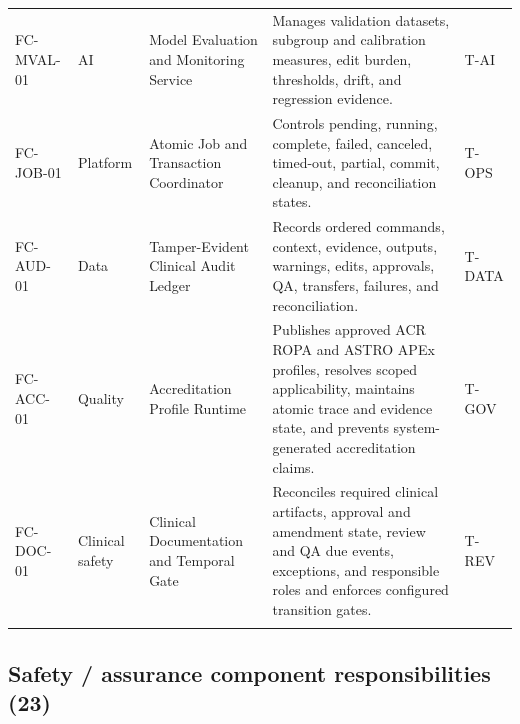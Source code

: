 \documentclass[11pt,letterpaper]{article}
\begin{document}
\begin{scriptsize}
\begin{longtable}{@{}L{0.15\textwidth}L{0.11\textwidth}L{0.21\textwidth}L{0.38\textwidth}L{0.08\textwidth}@{}}
\addlinespace[2pt]
\mbox{FC-MVAL-01} & AI & Model Evaluation and Monitoring Service & Manages validation datasets, subgroup and calibration measures, edit burden, thresholds, drift, and regression evidence. & T-AI \\
\addlinespace[2pt]
\mbox{FC-JOB-01} & Platform & Atomic Job and Transaction Coordinator & Controls pending, running, complete, failed, canceled, timed-out, partial, commit, cleanup, and reconciliation states. & T-OPS \\
\addlinespace[2pt]
\mbox{FC-AUD-01} & Data & Tamper-Evident Clinical Audit Ledger & Records ordered commands, context, evidence, outputs, warnings, edits, approvals, QA, transfers, failures, and reconciliation. & T-DATA \\
\addlinespace[2pt]
\mbox{FC-ACC-01} & Quality & Accreditation Profile Runtime & Publishes approved ACR ROPA and ASTRO APEx profiles, resolves scoped applicability, maintains atomic trace and evidence state, and prevents system-generated accreditation claims. & T-GOV \\
\addlinespace[2pt]
\mbox{FC-DOC-01} & Clinical safety & Clinical Documentation and Temporal Gate & Reconciles required clinical artifacts, approval and amendment state, review and QA due events, exceptions, and responsible roles and enforces configured transition gates. & T-REV \\
\addlinespace[2pt]
\end{longtable}
\end{scriptsize}

\subsection{Safety / assurance component responsibilities (23)}
\end{document}
